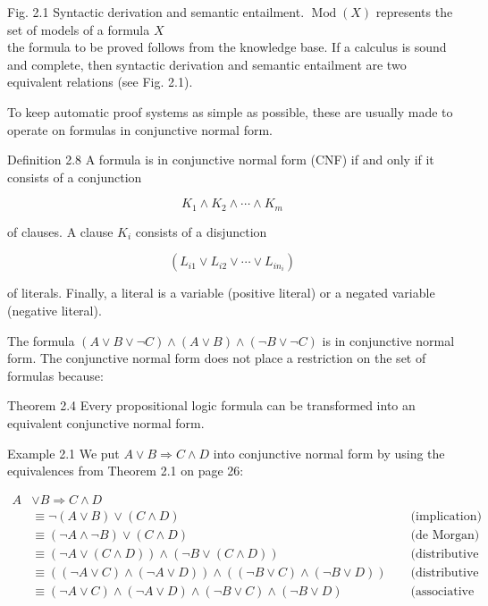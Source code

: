 \documentclass[10pt]{article}
\begin{document}
Fig. 2.1 Syntactic derivation and semantic entailment. $\operatorname{Mod}(X)$ represents the set of models of a formula $X$\\

the formula to be proved follows from the knowledge base. If a calculus is sound and complete, then syntactic derivation and semantic entailment are two equivalent relations (see Fig. 2.1).

To keep automatic proof systems as simple as possible, these are usually made to operate on formulas in conjunctive normal form.

Definition 2.8 A formula is in conjunctive normal form (CNF) if and only if it consists of a conjunction

$$
K_{1} \wedge K_{2} \wedge \cdots \wedge K_{m}
$$

of clauses. A clause $K_{i}$ consists of a disjunction

$$
\left(L_{i 1} \vee L_{i 2} \vee \cdots \vee L_{i n_{i}}\right)
$$

of literals. Finally, a literal is a variable (positive literal) or a negated variable (negative literal).

The formula $(A \vee B \vee \neg C) \wedge(A \vee B) \wedge(\neg B \vee \neg C)$ is in conjunctive normal form. The conjunctive normal form does not place a restriction on the set of formulas because:

Theorem 2.4 Every propositional logic formula can be transformed into an equivalent conjunctive normal form.

Example 2.1 We put $A \vee B \Rightarrow C \wedge D$ into conjunctive normal form by using the equivalences from Theorem 2.1 on page 26:

$$
\begin{aligned}
A & \vee B \Rightarrow C \wedge D & & \\
& \equiv \neg(A \vee B) \vee(C \wedge D) & & \text { (implication) } \\
& \equiv(\neg A \wedge \neg B) \vee(C \wedge D) & & \text { (de Morgan) } \\
& \equiv(\neg A \vee(C \wedge D)) \wedge(\neg B \vee(C \wedge D)) & & \text { (distributive law) } \\
& \equiv((\neg A \vee C) \wedge(\neg A \vee D)) \wedge((\neg B \vee C) \wedge(\neg B \vee D)) & & \text { (distributive law) } \\
& \equiv(\neg A \vee C) \wedge(\neg A \vee D) \wedge(\neg B \vee C) \wedge(\neg B \vee D) & & \text { (associative law) }
\end{aligned}
$$
\end{document}
